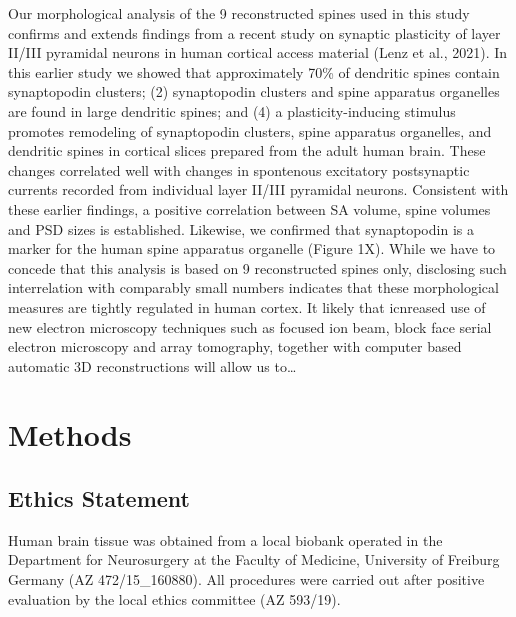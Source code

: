 \documentclass[fleqn,10pt]{wlscirep}
\begin{document}
	Our morphological analysis of the 9 reconstructed spines used in this study confirms and extends findings from a recent study on synaptic plasticity of layer II/III pyramidal neurons in human cortical access material (Lenz et al., 2021). In this earlier study we showed that approximately 70\% of dendritic spines contain synaptopodin clusters; (2) synaptopodin clusters and spine apparatus organelles are found in large dendritic spines; and (4) a plasticity-inducing stimulus promotes remodeling of synaptopodin clusters, spine apparatus organelles, and dendritic spines in cortical slices prepared from the adult human brain. These changes correlated well with changes in spontenous excitatory postsynaptic currents recorded from individual layer II/III pyramidal neurons. Consistent with these earlier findings, a positive correlation between SA volume, spine volumes and PSD sizes is established. Likewise, we confirmed that synaptopodin is a marker for the human spine apparatus organelle (Figure 1X). While we have to concede that this analysis is based on 9 reconstructed spines only, disclosing such interrelation with comparably small numbers indicates that these morphological measures are tightly regulated in human cortex. It likely that icnreased use of new electron microscopy techniques such as focused ion beam, block face serial electron microscopy and array tomography, together with computer based automatic 3D reconstructions will allow us to…


\section*{Methods}

\subsection*{Ethics Statement}Human brain tissue was obtained from a local biobank operated in the Department for Neurosurgery at the Faculty of Medicine, University of Freiburg Germany (AZ 472/15\_160880). All procedures were carried out after positive evaluation by the local ethics committee (AZ 593/19). 
\end{document}
